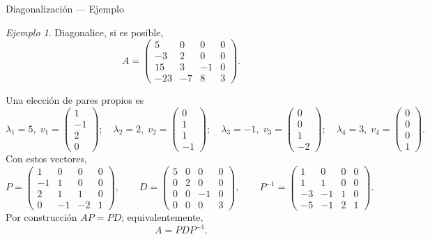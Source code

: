 \documentclass[aspectratio=169,11pt]{beamer}
\theoremstyle{remark}
\newtheorem{Ejem}[definicion]{Ejemplo}
\begin{document}
\begin{frame}[shrink=5]{Diagonalización — Ejemplo}
\footnotesize
\begin{Ejem}

Diagonalice, si es posible,
\[
A=\begin{pmatrix}5 & 0 & 0 & 0\\-3 & 2 & 0 & 0\\15 & 3 & -1 & 0\\-23 & -7 & 8 & 3\end{pmatrix}.
\]

\scriptsize
Una elección de pares propios es
\[
\lambda_1=5,\;v_1=\begin{pmatrix}1\\-1\\2\\0\end{pmatrix};\quad \lambda_2=2,\;v_2=\begin{pmatrix}0\\1\\1\\-1\end{pmatrix};\quad \lambda_3=-1,\;v_3=\begin{pmatrix}0\\0\\1\\-2\end{pmatrix};\quad \lambda_4=3,\;v_4=\begin{pmatrix}0\\0\\0\\1\end{pmatrix}.
\]
Con estos vectores,
\[
P=\begin{pmatrix}1 & 0 & 0 & 0\\-1 & 1 & 0 & 0\\2 & 1 & 1 & 0\\0 & -1 & -2 & 1\end{pmatrix},\qquad D=\begin{pmatrix}5 & 0 & 0 & 0\\0 & 2 & 0 & 0\\0 & 0 & -1 & 0\\0 & 0 & 0 & 3\end{pmatrix},\qquad P^{-1}=\begin{pmatrix}1 & 0 & 0 & 0\\1 & 1 & 0 & 0\\-3 & -1 & 1 & 0\\-5 & -1 & 2 & 1\end{pmatrix}.
\]
Por construcción $AP=PD$; equivalentemente,
\[
\boxed{A=PDP^{-1}}.
\]
\end{Ejem}
\end{frame}
\end{document}
